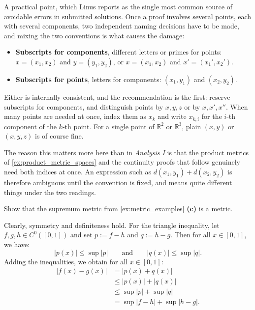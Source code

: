 \begin{remark}
\label{rem:naming_points_and_components}
A practical point, which Linus reports as the single most common source of avoidable errors in
submitted solutions. Once a proof involves several points, each with several components, two
independent naming decisions have to be made, and mixing the two conventions is what causes the
damage:
\begin{itemize}
  \item \textbf{Subscripts for components}, different letters or primes for points:
    $x = (x_1,x_2)$ and $y = (y_1,y_2)$, or $x = (x_1,x_2)$ and $x' = (x_1',x_2')$.
  \item \textbf{Subscripts for points}, letters for components: $(x_1,y_1)$ and $(x_2,y_2)$.
\end{itemize}
Either is internally consistent, and the recommendation is the first: reserve subscripts for
components, and distinguish points by $x, y, z$ or by $x, x', x''$. When many points are needed
at once, index them as $x_k$ and write $x_{k,i}$ for the $i$-th component of the $k$-th point.
For a single point of $\mathbb{R}^2$ or $\mathbb{R}^3$, plain $(x,y)$ or $(x,y,z)$ is of course
fine.

The reason this matters more here than in \emph{Analysis I} is that the product metrics of
\cref{ex:product_metric_spaces} and the continuity proofs that follow genuinely need both indices at once. An
expression such as $d(x_1,y_1) + d(x_2,y_2)$ is therefore ambiguous until the convention is fixed,
and means quite different things under the two readings.
\end{remark}

\begin{exercise}
\label{ex:sup_metric_is_metric}
Show that the supremum metric from \cref{ex:metric_examples} \textbf{(c)} is a metric.
\end{exercise}

\begin{exercisesolution}
Clearly, symmetry and definiteness hold. For the triangle inequality, let $f, g, h \in C^0([0,1])$ and
set $p := f - h$ and $q := h - g$. Then for all $x \in [0,1]$, we have:
\[|p(x)| \leq \sup|p| \qquad \text{and} \qquad |q(x)| \leq \sup|q|.\]
Adding the inequalities, we obtain for all $x \in [0,1]$:
\begin{align*}
|f(x) - g(x)| &= |p(x) + q(x)| \\
&\leq |p(x)| + |q(x)| \\
&\leq \sup|p| + \sup|q| \\
&= \sup|f - h| + \sup|h - g|.
\end{align*}
\end{exercisesolution}

